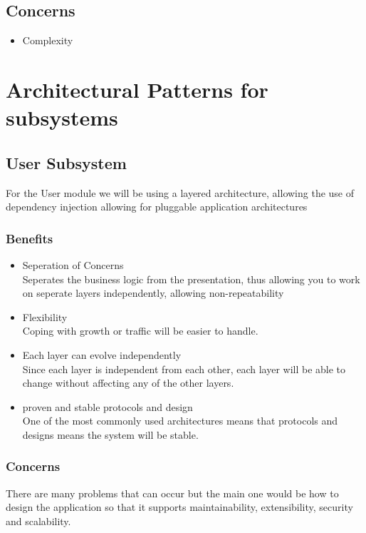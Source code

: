 \documentclass{article}
\begin{document}
 		\subsection{Concerns}
 			\begin{itemize}
 				\item Complexity
 				\bigskip
 				\\
 			\end{itemize}
 			 \section{Architectural Patterns for subsystems}
				\subsection{User Subsystem}
				For the User module we will be using a layered architecture, allowing the use of dependency injection allowing for pluggable application architectures
					\subsubsection{Benefits}
 						\begin{itemize}
 							\item Seperation of Concerns
 							\bigskip
 							\\
 							Seperates the business logic from the presentation, thus allowing you to work on seperate layers independently, allowing non-repeatability
 							\item Flexibility
 							\bigskip
 							\\
 							Coping with growth or traffic will be easier to handle.
 							\item Each layer can evolve independently
 							\bigskip
 							\\
 							Since each layer is independent from each other, each layer will be able to change without affecting any of the other layers.
 							\item proven and stable protocols and design
 							\bigskip
 							\\
 							 One of the most commonly used architectures means that protocols and designs means the system will be stable.
 						\end{itemize} 
	\subsubsection{Concerns}
 			
 				There are many problems that can occur but the main one would be how to design the application so that it supports maintainability, extensibility, security and scalability.
\end{document}
